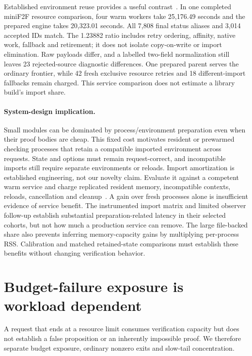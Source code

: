 \documentclass[10pt,twocolumn]{article}
\begin{document}
Established environment reuse provides a useful contrast~\cite{repl,kimina}.
In one completed miniF2F resource comparison, four warm workers take
25,176.49 seconds and the prepared engine takes 20,323.01 seconds.
All 7,808 final status aliases and 3,014 accepted IDs match.
The 1.23882 ratio includes retry ordering, affinity, native work, fallback
and retirement; it does not isolate copy-on-write or import elimination.
Raw payloads differ, and a labelled two-field normalization still leaves
23 rejected-source diagnostic differences.
One prepared parent serves the ordinary frontier, while 42 fresh exclusive
resource retries and 18 different-import fallbacks remain charged.
This service comparison does not estimate a library build's import share.

\paragraph{System-design implication.}
Small modules can be dominated by process/environment preparation even when
their proof bodies are cheap. This fixed cost motivates resident or prewarmed
checking processes that retain a compatible imported environment across
requests. State and options must remain request-correct, and incompatible
imports still require separate environments or reloads.
Import amortization is established engineering, not our novelty claim.
Evaluate it against a competent warm service and charge replicated resident
memory, incompatible contexts, reloads, cancellation and cleanup~\cite{fork}.
A gain over fresh processes alone is insufficient evidence of service benefit.
The instrumented import matrix and limited observer follow-up establish
substantial preparation-related latency in their selected cohorts, but not
how much a production service can remove. The large file-backed share also prevents inferring memory-capacity
gains by multiplying per-process RSS. Calibration and matched retained-state
comparisons must establish these benefits without changing verification
behavior.

\section{Budget-failure exposure is workload dependent}
\label{sec:failures}
A request that ends at a resource limit consumes verification capacity but
does not establish a false proposition or an inherently impossible proof.
We therefore separate budget exposure, ordinary nonzero exits and slow-tail
concentration.
\end{document}

